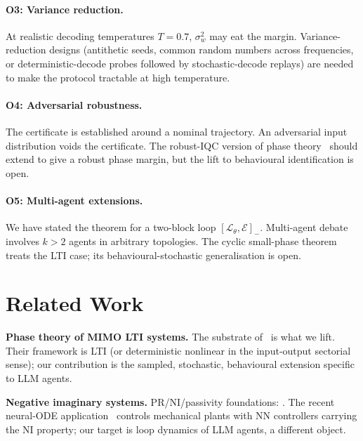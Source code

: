 \documentclass[11pt,a4paper]{article}
\theoremstyle{definition}
\theoremstyle{remark}
\newcommand{\agent}{\mathcal{L}_{\theta}}
\newcommand{\env}{\mathcal{E}}
\begin{document}
\paragraph{O3: Variance reduction.}  At realistic decoding temperatures
$T=0.7$, $\sigma_{w}^{2}$ may eat the margin.  Variance-reduction
designs (antithetic seeds, common random numbers across frequencies, or
deterministic-decode probes followed by stochastic-decode replays) are
needed to make the protocol tractable at high temperature.

\paragraph{O4: Adversarial robustness.}  The certificate is established
around a nominal trajectory.  An adversarial input distribution voids
the certificate.  The robust-IQC version of phase
theory~\citep{Megretski1997IQC,Zhao2022SmallGainSmallPhase} should
extend to give a robust phase margin, but the lift to behavioural
identification is open.

\paragraph{O5: Multi-agent extensions.}  We have stated the theorem for
a two-block loop $[\agent,\env]_{-}$.  Multi-agent debate involves $k>2$
agents in arbitrary topologies.  The cyclic small-phase
theorem~\citep{Wang2023CyclicSmallPhase} treats the LTI case; its
behavioural-stochastic generalisation is open.

\section{Related Work}\label{sec:related}

\textbf{Phase theory of MIMO LTI systems.}  The substrate
of~\citep{Chen2023PhaseTheory,Wang2024FirstFiveYears,Chen2021PhaseNonlinear,Zhao2022SmallGainSmallPhase,Wang2022DiscretePhase,Wang2023LTPPhase,Wang2023CyclicSmallPhase}
is what we lift.  Their framework is LTI (or deterministic nonlinear in
the input-output sectorial sense); our contribution is the sampled,
stochastic, behavioural extension specific to LLM agents.

\textbf{Negative imaginary systems.}  PR/NI/passivity foundations:
\citep{Anderson1973NetworkAnalysis,Lanzon2008NI,Mabrok2014NIFoundations,Patra2011MixedNIBR,Griggs2007MixedSGP}.
The recent neural-ODE application~\citep{Mabrok2025NINeuralODE} controls
mechanical plants with NN controllers carrying the NI property; our
target is loop dynamics of LLM agents, a different object.
\end{document}
